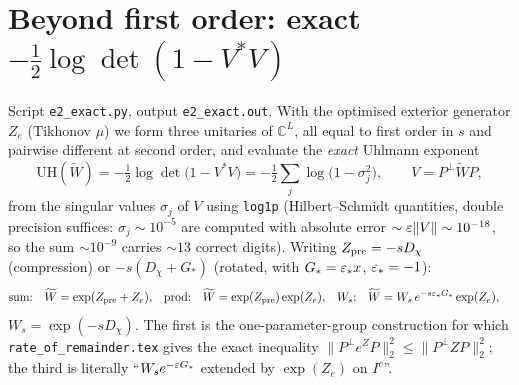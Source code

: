 \documentclass[11pt]{article}
\begin{document}
\section{Beyond first order: exact $-\tfrac12\log\det(1-V^*V)$}\label{sec:exact}

Script \texttt{e2\_exact.py}, output \texttt{e2\_exact.out}.  With the optimised exterior
generator $Z_e$ (Tikhonov $\mu$) we form three unitaries of $\mathbb C^L$, all equal to
first order in $s$ and pairwise different at second order, and evaluate the \emph{exact}
Uhlmann exponent
\begin{equation}
 \mathrm{UH}(\widetilde W)=-\tfrac12\log\det\bigl(1-V^*V\bigr)
 =-\tfrac12\sum_j\log\bigl(1-\sigma_j^2\bigr),\qquad V=P^\perp\widetilde WP,
\end{equation}
from the singular values $\sigma_j$ of $V$ using \texttt{log1p} (Hilbert--Schmidt
quantities, double precision suffices: $\sigma_j\sim10^{-5}$ are computed with absolute
error $\sim\varepsilon\|V\|\sim10^{-18}$, so the sum $\sim10^{-9}$ carries $\sim13$ correct
digits).  Writing $Z_{\rm pre}=-sD_\chi$ (compression) or $-s(D_\chi+G_*)$ (rotated, with
$G_*=\varepsilon_*x$, $\varepsilon_*=-1$):
\begin{align}
 \text{sum:}\quad&\widetilde W=\exp(Z_{\rm pre}+Z_e),&
 \text{prod:}\quad&\widetilde W=\exp(Z_{\rm pre})\exp(Z_e),&
 \text{$W_s$:}\quad&\widetilde W=W_s\,e^{-s\varepsilon_*G_*}\exp(Z_e),
\end{align}
$W_s=\exp(-sD_\chi)$.  The first is the one-parameter-group construction for which
\texttt{rate\_of\_remainder.tex} gives the exact inequality
$\|P^\perp e^{Z}P\|_2^2\le\|P^\perp ZP\|_2^2$; the third is literally
``$W_se^{-\varepsilon G_*}$ extended by $\exp(Z_e)$ on $I^c$''.
\end{document}
